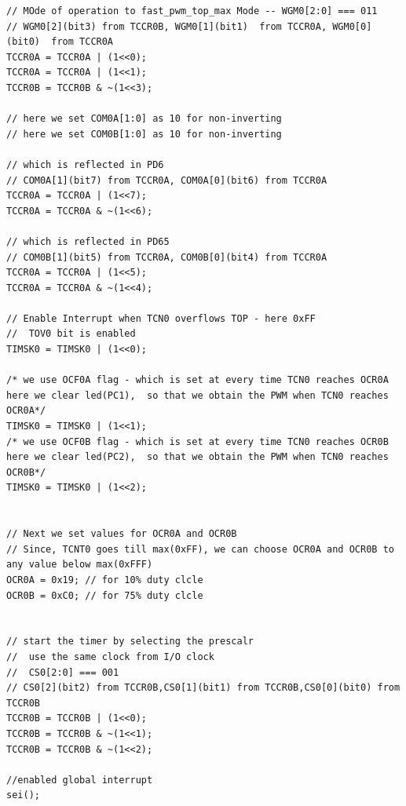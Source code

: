 \documentclass{article}
\begin{document}
\begin{verbatim}
// MOde of operation to fast_pwm_top_max Mode -- WGM0[2:0] === 011
// WGM0[2](bit3) from TCCR0B, WGM0[1](bit1)  from TCCR0A, WGM0[0](bit0)  from TCCR0A
TCCR0A = TCCR0A | (1<<0);
TCCR0A = TCCR0A | (1<<1);
TCCR0B = TCCR0B & ~(1<<3);	

// here we set COM0A[1:0] as 10 for non-inverting
// here we set COM0B[1:0] as 10 for non-inverting

// which is reflected in PD6
// COM0A[1](bit7) from TCCR0A, COM0A[0](bit6) from TCCR0A
TCCR0A = TCCR0A | (1<<7);
TCCR0A = TCCR0A & ~(1<<6);

// which is reflected in PD65
// COM0B[1](bit5) from TCCR0A, COM0B[0](bit4) from TCCR0A
TCCR0A = TCCR0A | (1<<5);
TCCR0A = TCCR0A & ~(1<<4);

// Enable Interrupt when TCN0 overflows TOP - here 0xFF
//  TOV0 bit is enabled
TIMSK0 = TIMSK0 | (1<<0);

/* we use OCF0A flag - which is set at every time TCN0 reaches OCR0A 
here we clear led(PC1),  so that we obtain the PWM when TCN0 reaches OCR0A*/
TIMSK0 = TIMSK0 | (1<<1);
/* we use OCF0B flag - which is set at every time TCN0 reaches OCR0B 
here we clear led(PC2),  so that we obtain the PWM when TCN0 reaches OCR0B*/
TIMSK0 = TIMSK0 | (1<<2);


// Next we set values for OCR0A and OCR0B
// Since, TCNT0 goes till max(0xFF), we can choose OCR0A and OCR0B to any value below max(0xFFF)
OCR0A = 0x19; // for 10% duty clcle
OCR0B = 0xC0; // for 75% duty clcle


// start the timer by selecting the prescalr
//  use the same clock from I/O clock
//  CS0[2:0] === 001
// CS0[2](bit2) from TCCR0B,CS0[1](bit1) from TCCR0B,CS0[0](bit0) from TCCR0B
TCCR0B = TCCR0B | (1<<0);
TCCR0B = TCCR0B & ~(1<<1);
TCCR0B = TCCR0B & ~(1<<2);

//enabled global interrupt
sei();
\end{verbatim}
\end{document}
